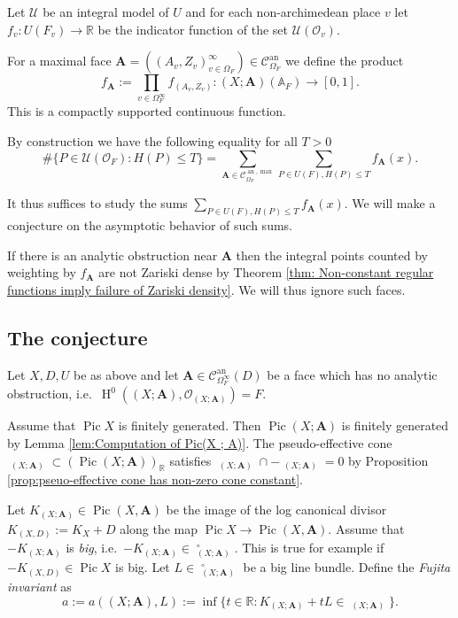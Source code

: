 \documentclass[a4paper,11pt,reqno]{amsart}
\newcommand{\R}{\mathbb{R}}
\newcommand{\A}{\mathbb{A}}
\DeclareMathOperator{\Pic}{Pic}
\DeclareMathOperator{\Eff}{\overline{Eff}}
\DeclareMathOperator{\HH}{H}
\DeclareMathOperator{\an}{an}
\theoremstyle{definition}
\begin{document}
Let $\mathcal{U}$ be an integral model of $U$ and for each non-archimedean place $v$ let $f_v: U(F_v) \to \R$ be the indicator function of the set $\mathcal{U}(\mathcal{O}_v)$.

 For a maximal face $\mathbf{A} = ((A_v, Z_v)_{v \in \Omega_{F}}^{\infty}) \in \mathcal{C}^{\an}_{\Omega_{F}}$ we define the product
\[f_{\mathbf{A}} := \prod_{v \in \Omega_{F}^{\infty}} f_{(A_v, Z_v)}: (X ; \mathbf{A})(\A_F) \to [0,1]. \]
This is a compactly supported continuous function. 

By construction we have the following equality for all $T > 0$
\begin{equation}
	\#\{P \in \mathcal{U}(\mathcal{O}_F) : H(P) \leq T \} = \sum_{\mathbf{A} \in \mathcal{C}^{\an, \max}_{\Omega_{F}}} \sum_{P \in U(F), H(P) \leq T} f_{\mathbf{A}}(x).
	\label{Writing the number of integral points as a sum over compactly supported functions}
\end{equation}

It thus suffices to study the sums $\sum_{P \in U(F), H(P) \leq T} f_{\mathbf{A}}(x).$ We will make a conjecture on the asymptotic behavior of such sums. 

If there is an analytic obstruction near $\mathbf{A}$ then the integral points counted by weighting by $f_{\mathbf{A}}$ are not Zariski dense by Theorem \ref{thm: Non-constant regular functions imply failure of Zariski density}. We will thus ignore such faces.
\subsection{The conjecture}
Let $X, D, U$ be as above and let $\mathbf{A} \in \mathcal{C}^{\an}_{\Omega_{F}^{\infty}}(D)$ be a face which has no analytic obstruction, i.e.~$\HH^0((X; \mathbf{A}), \mathcal{O}_{(X ; \mathbf{A})}) = F$. 

Assume that $\Pic X$ is finitely generated. Then $\Pic (X ; \mathbf{A})$ is finitely generated by Lemma \ref{lem:Computation of Pic(X ; A)}. The pseudo-effective cone $\Eff_{(X ; \mathbf{A})} \subset (\Pic (X ; \mathbf{A}))_{\R}$ satisfies $\Eff_{(X ; \mathbf{A})} \cap - \Eff_{(X ; \mathbf{A})} = 0$ by Proposition \ref{prop:pseuo-effective cone has non-zero cone constant}.

Let $K_{(X; \mathbf{A})} \in \Pic (X, \mathbf{A})$ be the image of the log canonical divisor $K_{(X,D)} := K_X + D$ along the map $\Pic X \to \Pic (X, \mathbf{A})$. Assume that $- K_{(X; \mathbf{A})}$ is \emph{big}, i.e.~$- K_{(X; \mathbf{A})} \in \Eff_{(X ; \mathbf{A})}^{\circ}$. This is true for example if $- K_{(X, D)} \in \Pic X$ is big. Let $L \in \Eff_{(X ; \mathbf{A})}^{\circ}$ be a big line bundle. Define the \emph{Fujita invariant} as 
\[
	a := a((X ; \mathbf{A}), L) := \inf\{t \in \R: K_{(X; \mathbf{A})} + t L \in \Eff_{(X ; \mathbf{A})}\}.
\]
\end{document}
